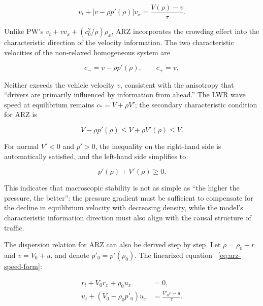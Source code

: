 \documentclass[11pt,a4paper,openany]{book}
\numberwithin{equation}{chapter}
\numberwithin{figure}{chapter}
\numberwithin{table}{chapter}
\begin{document}
\begin{equation}
v_t+\bigl[v-\rho p'(\rho)\bigr]v_x
=\frac{V(\rho)-v}{\tau}.
\label{eq:arz-speed-form}
\end{equation}

Unlike PW’s $v_t+vv_x+(c_0^2/\rho)\rho_x$, ARZ incorporates the crowding effect into the characteristic direction of the velocity information. The two characteristic velocities of the non-relaxed homogeneous system are

\begin{equation}
c_- =v-\rho p'(\rho),
\qquad c_+=v,
\label{eq:arz-characteristics}
\end{equation}

Neither exceeds the vehicle velocity $v$, consistent with the anisotropy that “drivers are primarily influenced by information from ahead.” The LWR wave speed at equilibrium remains $c_*=V+\rho V'$; the secondary characteristic condition for ARZ is

\begin{equation}
V-\rho p'(\rho)
\le V+\rho V'(\rho)
\le V.
\label{eq:arz-subcharacteristic}
\end{equation}

For normal $V'<0$ and $p'>0$, the inequality on the right-hand side is automatically satisfied, and the left-hand side simplifies to

\begin{equation}
p'(\rho)+V'(\rho)\ge0.
\label{eq:arz-simple-stability}
\end{equation}

This indicates that macroscopic stability is not as simple as “the higher the pressure, the better”: the pressure gradient must be sufficient to compensate for the decline in equilibrium velocity with decreasing density, while the model’s characteristic information direction must also align with the causal structure of traffic.




The dispersion relation for ARZ can also be derived step by step. Let $\rho=\rho_0+r$ and $v=V_0+u$, and denote $p'_0=p'(\rho_0)$. The linearized equation ~\eqref{eq:arz-speed-form}:







\begin{subequations}
\label{eq:arz-linear-system}
\begin{align}
r_t+V_0r_x+\rho_0u_x&=0,\\
u_t+(V_0-\rho_0p'_0)u_x&=\frac{V'_0r-u}{\tau}.
\end{align}
\end{subequations}
\end{document}
